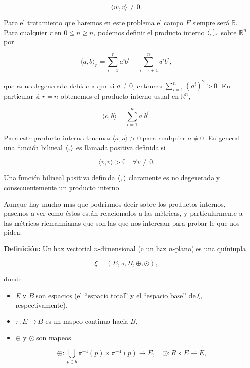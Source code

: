 \documentclass[a4paper,10pt]{article}
\numberwithin{equation}{section}
\newcommand{\definicion}{\textbf{Definición: }}
\begin{document}
\begin{equation}
 \langle w, v \rangle \ne 0.
\end{equation}

Para el tratamiento que haremos en este problema el campo $F$ siempre será $\mathbb{R}$. Para 
cualquier $r$ en $0 \leq n \geq n$, podemos definir el producto interno 
$\langle \space , \space \rangle_r$ sobre $\mathbb{R}^n$ por 

\begin{equation}
 \langle a, b \rangle_r = \sum_{i=1}^r a^ib^i - \sum_{i=r+1}^n a^ib^i,
\end{equation}

que es no degenerado debido a que si $a \ne 0$, entonces $\sum_{i=1}^n (a^i)^2 > 0$. 
En particular si $r = n$ obtenemos el producto interno usual en $\mathbb{R}^n$,

\begin{equation}
 \langle a, b \rangle = \sum_{i=1}^n a^ib^i.
\end{equation}

Para este producto interno tenemos $\langle a, a \rangle > 0$ para cualquier 
$a \ne 0$. En general una función bilineal $\langle \space, \space \rangle$ es 
llamada positiva definida si 

\begin{equation}
 \langle v, v \rangle > 0 \quad \forall v \ne 0.
\end{equation}

Una función bilineal positiva definida $\langle \space, \space \rangle$
claramente es no degenerada y consecuentemente un producto interno. 

\vspace{.3cm}

Aunque hay mucho más que podríamos decir sobre los productos internos, 
pasemos a ver como éstos están relacionados a las métricas, y particularmente 
a las métricas riemannianas que son las que nos interesan para probar lo que
nos piden. 

\definicion Un haz vectorial $n$-dimensional (o un haz $n$-plano)
es una quíntupla 

\begin{equation}
 \xi = (E,\pi,B,\oplus,\odot),
\end{equation}

donde 

\begin{itemize}
 \item $E$ y $B$ son espacios (el ``espacio total'' y el ``espacio base'' de 
 $\xi$, respectivamente),
 \item $\pi: E \rightarrow B$ es un mapeo continuo hacia $B$,
 \item $\oplus$ y $\odot$ son mapeos
 
 \begin{equation}
  \oplus: \underset{p \in b}{\bigcup} \pi^{-1}(p) \times \pi^{-1}(p) \rightarrow E, \quad 
  \odot: R \times E \rightarrow E,
 \end{equation}
\end{itemize}
\end{document}
